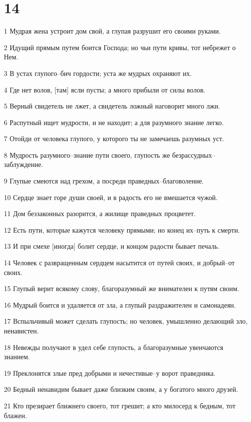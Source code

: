\chapter{14}

\par 1 Мудрая жена устроит дом свой, а глупая разрушит его своими руками.
\par 2 Идущий прямым путем боится Господа; но чьи пути кривы, тот небрежет о Нем.
\par 3 В устах глупого--бич гордости; уста же мудрых охраняют их.
\par 4 Где нет волов, [там] ясли пусты; а много прибыли от силы волов.
\par 5 Верный свидетель не лжет, а свидетель ложный наговорит много лжи.
\par 6 Распутный ищет мудрости, и не находит; а для разумного знание легко.
\par 7 Отойди от человека глупого, у которого ты не замечаешь разумных уст.
\par 8 Мудрость разумного--знание пути своего, глупость же безрассудных--заблуждение.
\par 9 Глупые смеются над грехом, а посреди праведных--благоволение.
\par 10 Сердце знает горе души своей, и в радость его не вмешается чужой.
\par 11 Дом беззаконных разорится, а жилище праведных процветет.
\par 12 Есть пути, которые кажутся человеку прямыми; но конец их--путь к смерти.
\par 13 И при смехе [иногда] болит сердце, и концом радости бывает печаль.
\par 14 Человек с развращенным сердцем насытится от путей своих, и добрый--от своих.
\par 15 Глупый верит всякому слову, благоразумный же внимателен к путям своим.
\par 16 Мудрый боится и удаляется от зла, а глупый раздражителен и самонадеян.
\par 17 Вспыльчивый может сделать глупость; но человек, умышленно делающий зло, ненавистен.
\par 18 Невежды получают в удел себе глупость, а благоразумные увенчаются знанием.
\par 19 Преклонятся злые пред добрыми и нечестивые--у ворот праведника.
\par 20 Бедный ненавидим бывает даже близким своим, а у богатого много друзей.
\par 21 Кто презирает ближнего своего, тот грешит; а кто милосерд к бедным, тот блажен.
